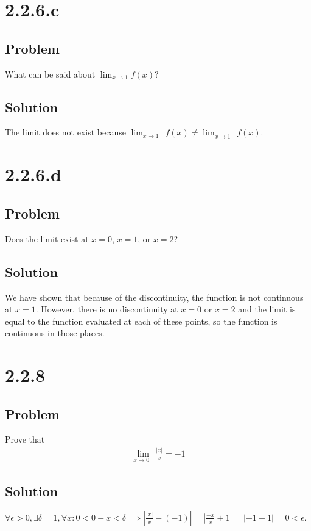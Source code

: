 \documentclass[12pt]{article}
\newcommand{\abs}  [1]{\left|       #1 \right|      }
\begin{document}
\section*{2.2.6.c}

\subsection*{Problem}
What can be said about $\lim_{x \to 1} f(x)$?

\subsection*{Solution}
The limit does not exist because $\lim_{x \to 1^-} f(x) \neq \lim_{x \to 1^+} f(x)$.



\section{2.2.6.d}

\subsection*{Problem}
Does the limit exist at $x = 0$, $x = 1$, or $x = 2$?

\subsection*{Solution}
We have shown that because of the discontinuity, the function is not continuous at $x = 1$. However, there is no discontinuity at $x = 0$ or $x = 2$ and the limit is equal to the function evaluated at each of these points, so the function is continuous in those places.



\section*{2.2.8}

\subsection*{Problem}
Prove that
\begin{align*}
    \lim_{x \to 0^-} \frac{\abs{x}}{x} = -1
\end{align*}

\subsection*{Solution}
$\forall \epsilon > 0, \exists \delta = 1, \forall x : 0 < 0 - x < \delta \implies \abs{\frac{\abs{x}}{x} - (-1)} = \abs{\frac{-x}{x} + 1} = \abs{-1 + 1} = 0 < \epsilon$.
\end{document}
